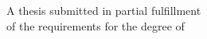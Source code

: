 \documentclass[onecolumn, 12pt, a4paper, twoside]{report}
\renewcommand{\headrulewidth}{0.00001mm}
\begin{document}


% 

\begin{titlepage}
\centering
\vspace*{2cm}
{\LARGE\bfseries \thesisTitle\par}
\vspace{1.5cm}
{\Large \thesisAuthor\par}
\vspace{1cm}
{\large A thesis submitted in partial fulfillment\\
of the requirements for the degree of\\
\thesisDegree\par}
\vspace{1cm}
{\large \thesisDepartment\\
\thesisUniversity\par}
\vspace{1cm}
{\large \thesisDate\par}
\end{titlepage}

\cleardoublepage



\chaptertitlefont{\fontsize{\chapterFontSize}{15}\selectfont\centering}  

\renewcommand{\headrulewidth}{0mm}
\fancyhead{}
\cleardoublepage
\cleardoublepage
\end{document}

